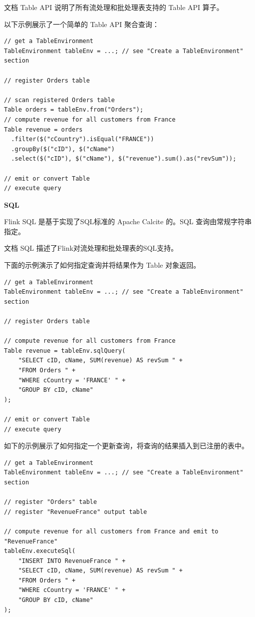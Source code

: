 \documentclass[cn,11pt,chinese]{elegantbook}
\begin{document}
文档 Table API 说明了所有流处理和批处理表支持的 Table API 算子。

以下示例展示了一个简单的 Table API 聚合查询：

\begin{verbatim}
// get a TableEnvironment
TableEnvironment tableEnv = ...; // see "Create a TableEnvironment" section

// register Orders table

// scan registered Orders table
Table orders = tableEnv.from("Orders");
// compute revenue for all customers from France
Table revenue = orders
  .filter($("cCountry").isEqual("FRANCE"))
  .groupBy($("cID"), $("cName")
  .select($("cID"), $("cName"), $("revenue").sum().as("revSum"));

// emit or convert Table
// execute query
\end{verbatim}

\textbf{SQL}

Flink SQL 是基于实现了SQL标准的 Apache Calcite 的。SQL 查询由常规字符串指定。

文档 SQL 描述了Flink对流处理和批处理表的SQL支持。

下面的示例演示了如何指定查询并将结果作为 Table 对象返回。

\begin{verbatim}
// get a TableEnvironment
TableEnvironment tableEnv = ...; // see "Create a TableEnvironment" section

// register Orders table

// compute revenue for all customers from France
Table revenue = tableEnv.sqlQuery(
    "SELECT cID, cName, SUM(revenue) AS revSum " +
    "FROM Orders " +
    "WHERE cCountry = 'FRANCE' " +
    "GROUP BY cID, cName"
);

// emit or convert Table
// execute query
\end{verbatim}

如下的示例展示了如何指定一个更新查询，将查询的结果插入到已注册的表中。

\begin{verbatim}
// get a TableEnvironment
TableEnvironment tableEnv = ...; // see "Create a TableEnvironment" section

// register "Orders" table
// register "RevenueFrance" output table

// compute revenue for all customers from France and emit to "RevenueFrance"
tableEnv.executeSql(
    "INSERT INTO RevenueFrance " +
    "SELECT cID, cName, SUM(revenue) AS revSum " +
    "FROM Orders " +
    "WHERE cCountry = 'FRANCE' " +
    "GROUP BY cID, cName"
);
\end{verbatim}
\end{document}
